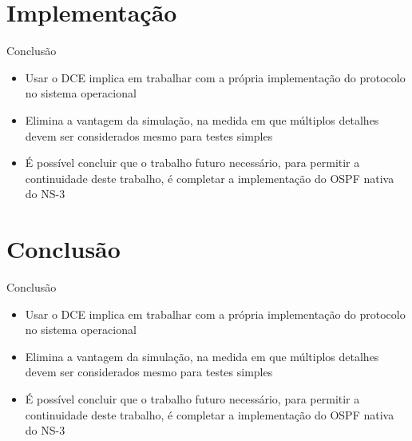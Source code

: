 \documentclass{beamer}
\newlength{\wideitemsep}
\let\olditem\item
\renewcommand{\item}{\setlength{\itemsep}{\wideitemsep}\olditem}
\begin{document}
\section{Implementação}
\begin{frame}{Conclusão}
\begin{itemize}
 \item Usar o DCE implica em trabalhar com a própria implementação do protocolo no sistema operacional %
 \item Elimina a vantagem da simulação, na medida em que múltiplos detalhes devem ser considerados mesmo para testes simples %
 \item É possível concluir que o trabalho futuro necessário, para permitir a continuidade deste trabalho, é completar a implementação do OSPF nativa do NS-3 %
\end{itemize}
\end{frame}

\section{Conclusão}
\begin{frame}{Conclusão}
\begin{itemize}
 \item Usar o DCE implica em trabalhar com a própria implementação do protocolo no sistema operacional %
 \item Elimina a vantagem da simulação, na medida em que múltiplos detalhes devem ser considerados mesmo para testes simples %
 \item É possível concluir que o trabalho futuro necessário, para permitir a continuidade deste trabalho, é completar a implementação do OSPF nativa do NS-3 %
\end{itemize}
\end{frame}
\end{document}
